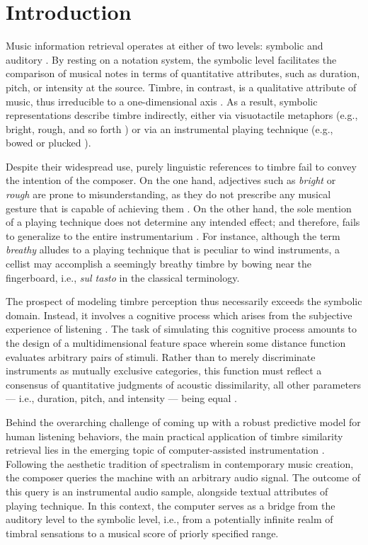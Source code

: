 \documentclass{bmcart}
\makeatletter
\newcommand*{\eg}{e.g.,\@\xspace}
\newcommand*{\ie}{i.e.,\@\xspace}
\makeatother
\begin{document}
\section*{Introduction}
\label{sec:intro}

Music information retrieval operates at either of two levels: symbolic and auditory \cite{downie2003mir}.
By resting on a notation system, the symbolic level facilitates the comparison of musical notes in terms of quantitative attributes, such as duration, pitch, or intensity at the source.
Timbre, in contrast, is a qualitative attribute of music, thus irreducible to a one-dimensional axis \cite{siedenburg2019chapter}.
As a result, symbolic representations describe timbre indirectly, either via visuotactile metaphors (\eg{} bright, rough, and so forth \cite{faure1996icmpc}) or via an instrumental playing technique (\eg{} bowed or plucked \cite{kostka2016book}).

Despite their widespread use, purely linguistic references to timbre fail to convey the intention of the composer.
On the one hand, adjectives such as \emph{bright} or \emph{rough} are prone to misunderstanding, as they do not prescribe any musical gesture that is capable of achieving them \cite{antoine2018isma}.
On the other hand, the sole mention of a playing technique does not determine any intended effect; and therefore, fails to generalize to the entire instrumentarium \cite{kolozali2011ismir}.
For instance, although the term \emph{breathy} alludes to a playing technique that is peculiar to wind instruments, a cellist may accomplish a seemingly breathy timbre by bowing near the fingerboard, i.e., \emph{sul tasto} in the classical terminology.

The prospect of modeling timbre perception thus necessarily exceeds the symbolic domain.
Instead, it involves a cognitive process which arises from the subjective experience of listening \cite{erickson1975book}.
The task of simulating this cognitive process amounts to the design of a multidimensional feature space wherein some distance function evaluates arbitrary pairs of stimuli.
Rather than to merely discriminate instruments as mutually exclusive categories, this function must reflect a consensus of quantitative judgments of acoustic dissimilarity, all other parameters --- \ie{} duration, pitch, and intensity --- being equal \cite{thoret2018jasa}.

Behind the overarching challenge of coming up with a robust predictive model for human listening behaviors, the main practical application of timbre similarity retrieval lies in the emerging topic of computer-assisted instrumentation \cite{maresz2013cmr}.
Following the aesthetic tradition of spectralism in contemporary music creation, the composer queries the machine with an arbitrary audio signal.
The outcome of this query is an instrumental audio sample, alongside textual attributes of playing technique.
In this context, the computer serves as a bridge from the auditory level to the symbolic level, \ie{} from a potentially infinite realm of timbral sensations to a musical score of priorly specified range.
\end{document}
